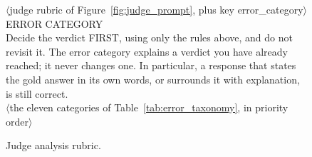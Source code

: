 \begin{figure}[h]
\centering
\begin{tcolorbox}[colback=gray!5,colframe=gray!50,boxrule=0.4pt,fontupper=\small\ttfamily]
$\langle$judge rubric of Figure~\ref{fig:judge_prompt}, plus key error\_category$\rangle$\\[0.5em]
ERROR CATEGORY\\
Decide the verdict FIRST, using only the rules above, and do not revisit it. The error category explains a verdict you have already reached; it never changes one. In particular, a response that states the gold answer in its own words, or surrounds it with explanation, is still correct.\\[0.5em]
$\langle$the eleven categories of Table~\ref{tab:error_taxonomy}, in priority order$\rangle$
\end{tcolorbox}
\caption{Judge analysis rubric.}
\label{fig:judge_prompt_errcat}
\end{figure}